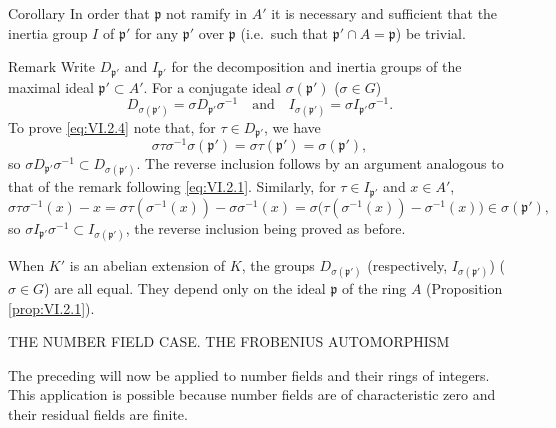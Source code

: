 \begin{statement}{Corollary}
In order that $\mathfrak{p}$ not ramify in $A'$ it is necessary and
sufficient that the inertia group $I$ of $\mathfrak{p}'$ for any
$\mathfrak{p}'$ over $\mathfrak{p}$ (i.e.\ such that
$\mathfrak{p}'\cap A=\mathfrak{p}$) be trivial.
\end{statement}

\begin{statement}{Remark}
Write $D_{\mathfrak{p}'}$ and $I_{\mathfrak{p}'}$ for the decomposition
and inertia groups of the maximal ideal $\mathfrak{p}'\subset A'$. For a
conjugate ideal $\sigma(\mathfrak{p}')$ ($\sigma\in G$)
\begin{equation}
D_{\sigma(\mathfrak{p}')}=\sigma D_{\mathfrak{p}'}\sigma^{-1}
\quad\text{and}\quad
I_{\sigma(\mathfrak{p}')}=\sigma I_{\mathfrak{p}'}\sigma^{-1}.
\label{eq:VI.2.4}
\end{equation}
To prove \eqref{eq:VI.2.4} note that, for
$\tau\in D_{\mathfrak{p}'}$, we have
\[
\sigma\tau\sigma^{-1}\sigma(\mathfrak{p}')
=\sigma\tau(\mathfrak{p}')=\sigma(\mathfrak{p}'),
\]
so $\sigma D_{\mathfrak{p}'}\sigma^{-1}
\subset D_{\sigma(\mathfrak{p}')}$. The reverse inclusion follows by an
argument analogous to that of the remark following \eqref{eq:VI.2.1}.
Similarly, for $\tau\in I_{\mathfrak{p}'}$ and $x\in A'$,
\[
\sigma\tau\sigma^{-1}(x)-x
=\sigma\tau(\sigma^{-1}(x))-\sigma\sigma^{-1}(x)
=\sigma\bigl(\tau(\sigma^{-1}(x))-\sigma^{-1}(x)\bigr)
\in\sigma(\mathfrak{p}'),
\]
so $\sigma I_{\mathfrak{p}'}\sigma^{-1}
\subset I_{\sigma(\mathfrak{p}')}$, the reverse inclusion being proved as
before.
\end{statement}

When $K'$ is an abelian extension of $K$, the groups
$D_{\sigma(\mathfrak{p}')}$ (respectively,
$I_{\sigma(\mathfrak{p}')}$) ($\sigma\in G$) are all equal. They depend
only on the ideal $\mathfrak{p}$ of the ring $A$ (Proposition
\ref{prop:VI.2.1}).

%
        {THE NUMBER FIELD CASE. THE FROBENIUS AUTOMORPHISM}

The preceding will now be applied to number fields and their rings of
integers. This application is possible because number fields are of
characteristic zero and their residual fields are finite.

